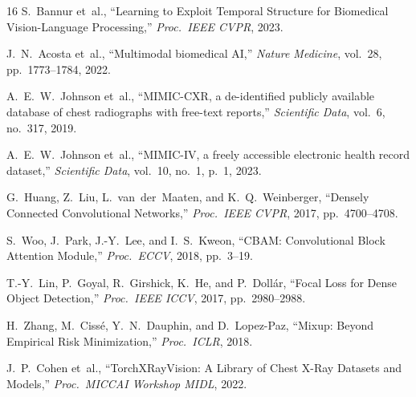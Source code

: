 \documentclass[conference]{IEEEtran}
\begin{document}
{\begin{thebibliography}{16}
S.~Bannur et~al., ``Learning to Exploit Temporal Structure for Biomedical Vision-Language Processing,'' \emph{Proc.\ IEEE CVPR}, 2023.

J.~N.~Acosta et~al., ``Multimodal biomedical AI,'' \emph{Nature Medicine}, vol.~28, pp.~1773--1784, 2022.

A.~E.~W.~Johnson et~al., ``MIMIC-CXR, a de-identified publicly available database of chest radiographs with free-text reports,'' \emph{Scientific Data}, vol.~6, no.~317, 2019.

A.~E.~W.~Johnson et~al., ``MIMIC-IV, a freely accessible electronic health record dataset,'' \emph{Scientific Data}, vol.~10, no.~1, p.~1, 2023.

G.~Huang, Z.~Liu, L.~van~der~Maaten, and K.~Q.~Weinberger, ``Densely Connected Convolutional Networks,'' \emph{Proc.\ IEEE CVPR}, 2017, pp.~4700--4708.

S.~Woo, J.~Park, J.-Y.~Lee, and I.~S.~Kweon, ``CBAM: Convolutional Block Attention Module,'' \emph{Proc.\ ECCV}, 2018, pp.~3--19.

T.-Y.~Lin, P.~Goyal, R.~Girshick, K.~He, and P.~Doll{\'a}r, ``Focal Loss for Dense Object Detection,'' \emph{Proc.\ IEEE ICCV}, 2017, pp.~2980--2988.

H.~Zhang, M.~Ciss{\'e}, Y.~N.~Dauphin, and D.~Lopez-Paz, ``Mixup: Beyond Empirical Risk Minimization,'' \emph{Proc.\ ICLR}, 2018.

J.~P.~Cohen et~al., ``TorchXRayVision: A Library of Chest X-Ray Datasets and Models,'' \emph{Proc.\ MICCAI Workshop MIDL}, 2022.

\end{thebibliography}
}
\end{document}
